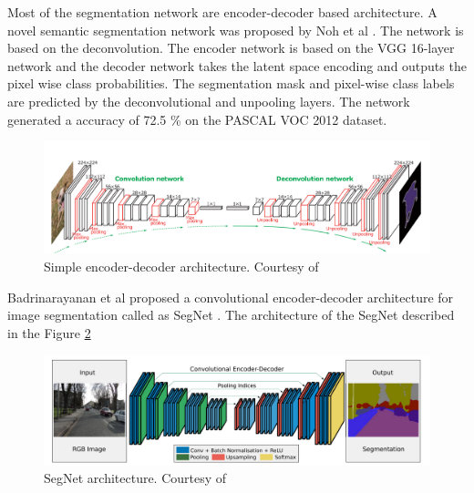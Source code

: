     Most of the segmentation network are encoder-decoder based architecture. A novel semantic segmentation network was proposed by Noh et al \cite{64_noh2015learning}. The network is based on the deconvolution. The encoder network is based on the VGG 16-layer network and the decoder network takes the latent space encoding and outputs the pixel wise class probabilities. The segmentation mask and pixel-wise class labels are predicted by the deconvolutional and unpooling layers. The network generated a accuracy of 72.5 \% on the PASCAL VOC 2012 dataset. 
    
    \begin{figure}[h]
    	\centering
    	\includegraphics[width=14cm]{images/general_seg.png}
    	\caption{Simple encoder-decoder architecture. Courtesy of \cite{64_noh2015learning}}
    	\label{fig:general_seg}
    \end{figure} 
    
    Badrinarayanan et al proposed a convolutional encoder-decoder architecture for image segmentation called as SegNet \cite{62_badrinarayanan2017segnet}. The architecture of the SegNet described in the Figure \ref{fig:segnet}  
    
    \begin{figure}[h]
    	\centering
    	\includegraphics[width=14cm]{images/segnet.png}
    	\caption{SegNet architecture. Courtesy of \cite{62_badrinarayanan2017segnet}}
    	\label{fig:segnet}
    \end{figure} 
    
